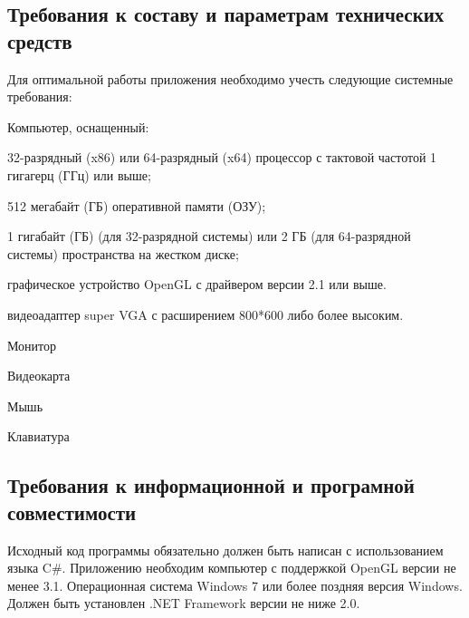 \subsection{Требования к составу и параметрам технических средств}
Для оптимальной работы приложения необходимо учесть следующие системные требования:
\begin{my_enumerate}
\item Компьютер, оснащенный:
    \begin{my_enumerate}
    \item 32-разрядный (x86) или 64-разрядный (x64) процессор с тактовой частотой 1 гигагерц (ГГц) или выше;
    \item 512 мегабайт (ГБ) оперативной памяти (ОЗУ);
    \item 1 гигабайт (ГБ) (для 32-разрядной системы) или 2 ГБ (для 64-разрядной системы) пространства на жестком диске;
    \item графическое устройство OpenGL с драйвером версии 2.1 или выше.
    \item видеоадаптер super VGA с расширением 800*600 либо более высоким.
    \end{my_enumerate}
\item Монитор
\item Видеокарта
\item Мышь
\item Клавиатура
\end{my_enumerate}


\subsection{Требования к информационной и програмной совместимости}
Исходный код программы обязательно должен быть написан с использованием языка C\#. Приложению необходим компьютер с поддержкой OpenGL версии не менее 3.1. Операционная система Windows 7 или более поздняя версия Windows. Должен быть установлен .NET Framework версии не ниже 2.0.

